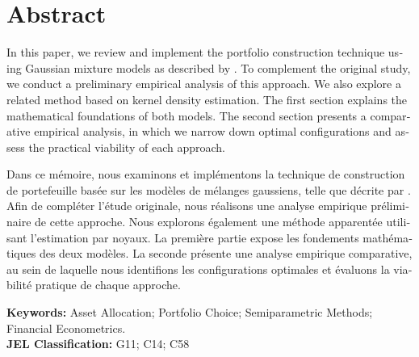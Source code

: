 \chapter*{Abstract}
\begin{otherlanguage}{english}
In this paper, we review and implement the portfolio construction technique using Gaussian mixture models as described by \cite{luxenbergPortfolioConstructionGaussian2022}. To complement the original study, we conduct a preliminary empirical analysis of this approach. We also explore a related method based on kernel density estimation. The first section explains the mathematical foundations of both models. The second section presents a comparative empirical analysis, in which we narrow down optimal configurations and assess the practical viability of each approach.
\end{otherlanguage}

\vspace{3ex}

\begin{otherlanguage}{french}
    Dans ce mémoire, nous examinons et implémentons la technique de construction de portefeuille basée sur les modèles de mélanges gaussiens, telle que décrite par \cite{luxenbergPortfolioConstructionGaussian2022}. Afin de compléter l'étude originale, nous réalisons une analyse empirique préliminaire de cette approche. Nous explorons également une méthode apparentée utilisant l'estimation par noyaux. La première partie expose les fondements mathématiques des deux modèles. La seconde présente une analyse empirique comparative, au sein de laquelle nous identifions les configurations optimales et évaluons la viabilité pratique de chaque approche.
\end{otherlanguage}

\vfill
  \textbf{Keywords:} Asset Allocation; Portfolio Choice; Semiparametric Methods; Financial Econometrics.\\
  \textbf{JEL Classification:} G11; C14; C58
